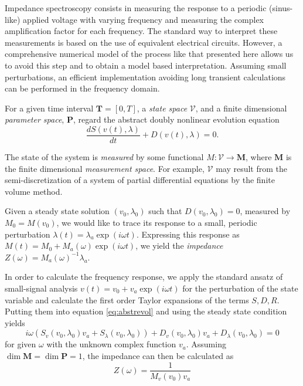\documentclass[english,nofirstpagebreak,empty]{amsproc}
\begin{document}
Impedance  spectroscopy  consists  in  measuring  the  response  to  a
periodic  (sinus-like)  applied  voltage  with varying  frequency  and
measuring  the complex  amplification factor  for each  frequency. The
standard way  to interpret these measurements  is based on  the use of
equivalent  electrical circuits. However, a  comprehensive numerical  model of
the process like that presented here allows us to avoid this step
and  to   obtain  a   model  based  interpretation.    Assuming  small
perturbations,  an efficient  implementation  avoiding long  transient
calculations can be performed in the frequency domain.

For a  given time  interval ${\mathbf T}=[0,T]$,  a {\em  state space}
$\mathcal V$, and a finite dimensional {\em parameter space}, $\mathbf
P$, regard the abstract doubly nonlinear evolution equation
\begin{equation}\label{eq:abstrevol}
 \frac{d S(v(t),\lambda)}{dt} + D(v(t),\lambda)=0.
\end{equation}

The  state of  the system  is {\em  measured} by  some  functional $M:
\mathcal V  \rightarrow \mathbf M$, where  $\mathbf M $  is the finite
dimensional {\em  measurement space}. For example,  $\mathcal V$ may
result   from  the   semi-discretization  of   a  system   of  partial
differential equations by the finite volume method.

Given  a steady state  solution $(v_0,  \lambda_0)$ such  that $D(v_0,
\lambda_0)=0$, measured  by $M_0=M(v_0)$, we  would like to  trace its
response  to  a small,  periodic  perturbation $\lambda(t)=  \lambda_a
\exp(i\omega  t)   $.   Expressing   this  response  as   $M(t)=  M_0+
M_a(\omega) \exp(i\omega t)$, we yield the {\em impedance} $Z(\omega)=
M_a(\omega)^{-1} \lambda_a$.



In order  to calculate the  frequency response, we apply  the standard
ansatz of small-signal  analysis $v(t)=v_0+v_a\exp(i\omega t)$ for the
perturbation  of the  state  variable and  calculate  the first  order
Taylor expansions  of the terms  $S,D,R$.  Putting them  into equation
\eqref{eq:abstrevol} and using the steady state condition yields
\begin{equation}\label{eq:comp}
    i\omega\left( 
      S_v(v_0,\lambda_0)v_a+
      S_\lambda(v_0,\lambda_0)\right)+ 
    D_v(v_0,\lambda_0)v_a+
    D_\lambda(v_0,\lambda_0)=0
\end{equation}
for given $\omega$ with the unknown complex function $v_a$.
Assuming $\dim \mathbf M =\dim \mathbf P=1$,
the impedance  can  then be calculated as 
\begin{equation}\label{eq:imp}
  Z(\omega)= \frac1{M_v(v_0)v_a}
\end{equation}
\end{document}
